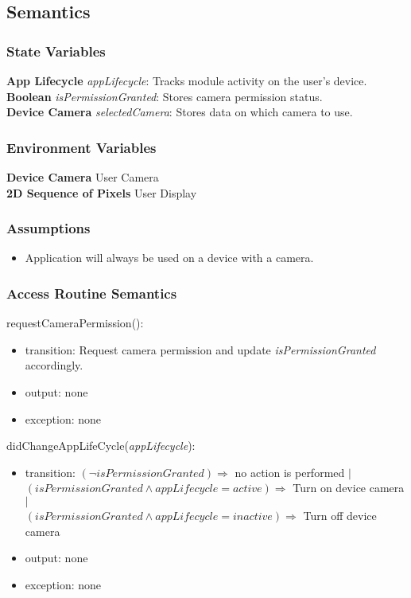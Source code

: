 \documentclass[12pt, titlepage]{article}
\begin{document}
\subsection{Semantics}

\subsubsection{State Variables}

\textbf{App Lifecycle} \textit{appLifecycle}: Tracks module activity on the user's device. \\
\textbf{Boolean} \textit{isPermissionGranted}: Stores camera permission status. \\
\textbf{Device Camera} \textit{selectedCamera}: Stores data on which camera to use.

\subsubsection{Environment Variables}

\textbf{Device Camera} User Camera \\
\textbf{2D Sequence of Pixels} User Display

\subsubsection{Assumptions}

\begin{itemize}
  \item Application will always be used on a device with a camera.
\end{itemize}

\subsubsection{Access Routine Semantics}

\noindent requestCameraPermission():
\begin{itemize}
  \item transition: Request camera permission and update \textit{isPermissionGranted} accordingly.
  \item output: none
  \item exception: none
  \end{itemize}

\noindent didChangeAppLifeCycle(\textit{appLifecycle}):
\begin{itemize}
  \item transition: $(\neg isPermissionGranted) \Rightarrow$ no action is performed $|$\\
                    $(isPermissionGranted \land appLifecycle = active) \Rightarrow$ Turn on device camera $|$\\
                    $(isPermissionGranted \land appLifecycle = inactive) \Rightarrow$ Turn off device camera
  \item output: none
  \item exception: none
\end{itemize}
\end{document}
